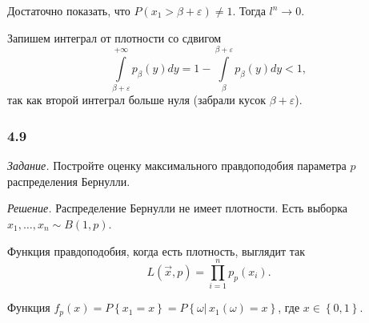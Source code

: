 Достаточно показать, что $P \left( x_1 > \beta + \varepsilon \right) \neq 1$.
Тогда $l^n \to 0$.

Запишем интеграл от плотности со сдвигом
$$ \int \limits_{ \beta + \varepsilon }^{+ \infty } p_{ \beta } \left( y \right) dy =
  1 - \int \limits_{ \beta }^{ \beta + \varepsilon } p_{ \beta } \left( y \right) dy <
  1,$$
так как второй интеграл больше нуля (забрали кусок $ \beta + \varepsilon $).

\subsubsection*{4.9}

\textit{Задание.} Постройте оценку максимального правдоподобия параметра $p$ распределения Бернулли.

\textit{Решение.} Распределение Бернулли не имеет плотности.
Есть выборка $x_1, \dotsc, x_n \sim B \left( 1, p \right) $.

Функция правдоподобия, когда есть плотность, выглядит так
$$L \left( \vec{x}, p \right) =
  \prod \limits_{i = 1}^n p_p \left( x_i \right).$$

Функция
$f_p \left( x \right) =
  P \left\{ x_1 = x \right\} =
  P \left\{ \left. \omega \right| \, x_1 \left( \omega \right) = x \right\} $,
где $x \in \left\{ 0, 1 \right\} $.

